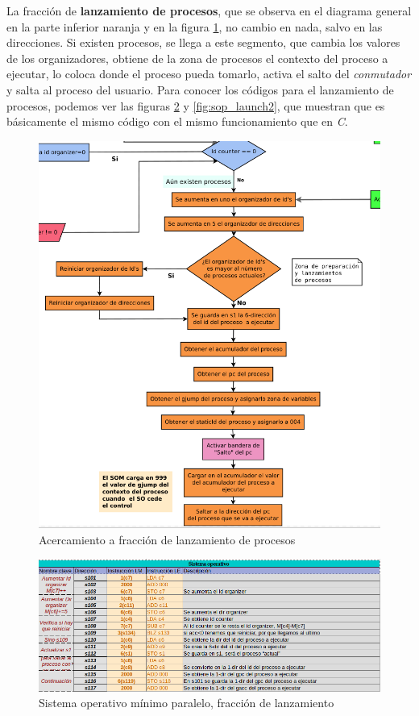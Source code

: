 \documentclass[letterpaper,12pt,oneside]{book}
\begin{document}
			
			La fracción de \textbf{lanzamiento de procesos}, que se observa en el diagrama general en la parte inferior naranja
			y en la figura \ref{fig:diag_somp_launch_process}, no cambio en nada, 
			salvo en las direcciones. Si existen procesos,
			se llega a este segmento, que cambia los valores de los organizadores, obtiene de la zona de procesos el contexto del proceso
			a ejecutar,
			lo coloca donde el proceso pueda tomarlo, activa el salto del \textit{conmutador} y salta al proceso del usuario. Para 
			conocer los códigos para el lanzamiento de procesos, podemos ver las figuras \ref{fig:sop_launch} y \ref{fig:sop_launch2},
			que muestran que es básicamente el mismo código con el mismo funcionamiento que en \textit{C}.
			
		
			\begin{figure}[H]		
				\centering
				\includegraphics[scale=0.45]{media/Paralela/diag_somp_launch_process.png}
				\caption{Acercamiento a fracción de lanzamiento de procesos}
				\label{fig:diag_somp_launch_process}
			\end{figure}	
			
			
			\begin{figure}[H]		
				\centering
				\includegraphics[scale=0.53]{media/Paralela/sop_launch1.png}
				\caption{Sistema operativo mínimo paralelo, fracción de lanzamiento}
				\label{fig:sop_launch}
			\end{figure}	
			
\end{document}
